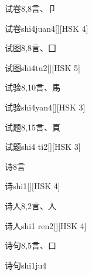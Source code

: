 \begin{entry}{试卷}{8,8}{⾔、⼙}
  \begin{phonetics}{试卷}{shi4juan4}[][HSK 4]
  \end{phonetics}
\end{entry}

\begin{entry}{试图}{8,8}{⾔、⼞}
  \begin{phonetics}{试图}{shi4tu2}[][HSK 5]
  \end{phonetics}
\end{entry}

\begin{entry}{试验}{8,10}{⾔、⾺}
  \begin{phonetics}{试验}{shi4yan4}[][HSK 3]
  \end{phonetics}
\end{entry}

\begin{entry}{试题}{8,15}{⾔、⾴}
  \begin{phonetics}{试题}{shi4 ti2}[][HSK 3]
  \end{phonetics}
\end{entry}

\begin{entry}{诗}{8}{⾔}
  \begin{phonetics}{诗}{shi1}[][HSK 4]
  \end{phonetics}
\end{entry}

\begin{entry}{诗人}{8,2}{⾔、⼈}
  \begin{phonetics}{诗人}{shi1 ren2}[][HSK 4]
  \end{phonetics}
\end{entry}

\begin{entry}{诗句}{8,5}{⾔、⼝}
  \begin{phonetics}{诗句}{shi1ju4}
  \end{phonetics}
\end{entry}

